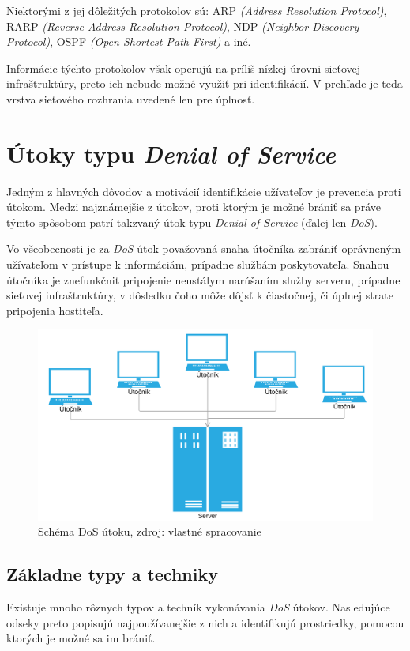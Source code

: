 \documentclass[
  digital, %
  table,   %
  lof,     %
  nolot,   %
  nocover
]{fithesis3}
\begin{document}
Niektorými z jej dôležitých protokolov sú: ARP
\textit{(Address Resolution Protocol)}, RARP
\textit{(Reverse Address Resolution Protocol)},
NDP \textit{(Neighbor Discovery Protocol)}, OSPF
\textit{(Open Shortest Path First)} a iné.

Informácie týchto protokolov však operujú na príliš nízkej úrovni sieťovej
infraštruktúry, preto ich nebude možné využiť pri identifikácií. V prehľade je 
teda vrstva sieťového rozhrania uvedené len pre úplnosť.

\chapter{Útoky typu \textit{Denial of Service}}
\label{ch:dos}
Jedným z hlavných dôvodov a motivácií identifikácie užívateľov je prevencia
proti útokom. Medzi najznámejšie z útokov, proti ktorým je možné brániť sa
práve týmto spôsobom patrí takzvaný útok typu \textit{Denial of Service}
(ďalej len \textit{DoS}).

Vo všeobecnosti je za \textit{DoS} útok považovaná snaha útočníka zabrániť
oprávneným užívateľom v prístupe k informáciám, prípadne službám poskytovateľa.
Snahou útočníka je znefunkčniť pripojenie neustálym narúšaním služby serveru,
prípadne sieťovej infraštruktúry, v dôsledku čoho môže dôjsť k čiastočnej, či
úplnej strate pripojenia hostiteľa. 

\begin{figure}[h]
  \centering
    \includegraphics[width=\textwidth]{images/dos.png}
  \caption{Schéma DoS útoku, zdroj: vlastné spracovanie}
  \label{fig:dos}
\end{figure}

\section{Základne typy a techniky}
Existuje mnoho rôznych typov a techník vykonávania \textit{DoS} útokov.
Nasledujúce odseky preto popisujú najpoužívanejšie z nich a identifikujú
prostriedky, pomocou ktorých je možné sa im brániť.
\end{document}
